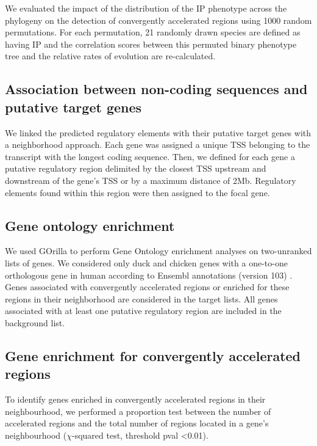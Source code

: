 We evaluated the impact of the distribution of the IP phenotype across the phylogeny on the detection of convergently accelerated regions using 1000 random permutations. For each permutation, 21 randomly drawn species are defined as having IP and the correlation scores between this permuted binary phenotype tree and the relative rates of evolution are re-calculated. 

\subsection*{Association between non-coding sequences and putative target genes}
We linked the predicted regulatory elements with their putative target genes with a neighborhood approach. Each gene was assigned a unique TSS belonging to the transcript with the longest coding sequence. Then, we defined for each gene a putative regulatory region delimited by the closest TSS upstream and downstream of the gene’s TSS or by a maximum distance of 2Mb. Regulatory elements found within this region were then assigned to the focal gene.


\subsection*{Gene ontology enrichment}
We used GOrilla \citep{eden_gorilla_2009} to perform Gene Ontology enrichment analyses on two-unranked lists of genes. We considered only duck and chicken genes with a one-to-one orthologous gene in human according to Ensembl annotations (version 103) \citep{cunningham_ensembl_2019}. Genes associated with convergently accelerated regions or enriched for these regions in their neighborhood are considered in the target lists. All genes associated with at least one putative regulatory region are included in the background list.

\subsection*{Gene enrichment for convergently accelerated regions}
To identify genes enriched in convergently accelerated regions in their neighbourhood, we performed a proportion test between  the number of accelerated regions and the total number of regions located in a gene's neighbourhood ($\chi$-squared test, threshold pval <0.01).